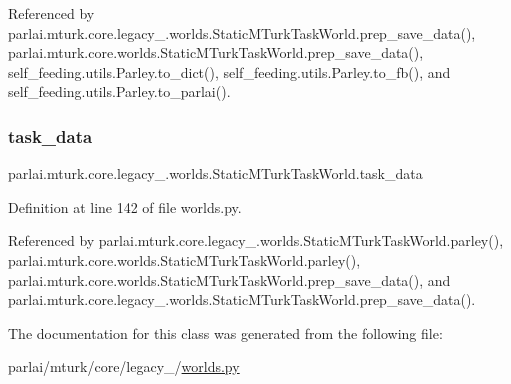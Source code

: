 Referenced by parlai.\+mturk.\+core.\+legacy\+\_.\+worlds.\+Static\+M\+Turk\+Task\+World.\+prep\+\_\+save\+\_\+data(), parlai.\+mturk.\+core.\+worlds.\+Static\+M\+Turk\+Task\+World.\+prep\+\_\+save\+\_\+data(), self\+\_\+feeding.\+utils.\+Parley.\+to\+\_\+dict(), self\+\_\+feeding.\+utils.\+Parley.\+to\+\_\+fb(), and self\+\_\+feeding.\+utils.\+Parley.\+to\+\_\+parlai().

\mbox{\label{classparlai_1_1mturk_1_1core_1_1legacy__2018_1_1worlds_1_1StaticMTurkTaskWorld_acc5db69ea637dc47c40833268ce933e9}} 
\subsubsection{\texorpdfstring{task\+\_\+data}{task\_data}}
{\footnotesize\ttfamily parlai.\+mturk.\+core.\+legacy\+\_.\+worlds.\+Static\+M\+Turk\+Task\+World.\+task\+\_\+data}



Definition at line 142 of file worlds.\+py.



Referenced by parlai.\+mturk.\+core.\+legacy\+\_.\+worlds.\+Static\+M\+Turk\+Task\+World.\+parley(), parlai.\+mturk.\+core.\+worlds.\+Static\+M\+Turk\+Task\+World.\+parley(), parlai.\+mturk.\+core.\+worlds.\+Static\+M\+Turk\+Task\+World.\+prep\+\_\+save\+\_\+data(), and parlai.\+mturk.\+core.\+legacy\+\_.\+worlds.\+Static\+M\+Turk\+Task\+World.\+prep\+\_\+save\+\_\+data().



The documentation for this class was generated from the following file\+:\begin{DoxyCompactItemize}
\item 
parlai/mturk/core/legacy\+\_/\hyperlink{parlai_2mturk_2core_2legacy__2018_2worlds_8py}{worlds.\+py}\end{DoxyCompactItemize}

